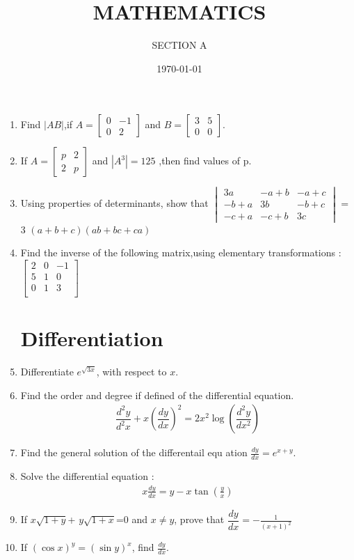 \documentclass[2pt,-letter paper]{article}
\title{MATHEMATICS}
\author{SECTION A}
\date{\today}
\providecommand{\myvec}[1]{\ensuremath{\begin{bmatrix}#1\end{bmatrix}}}
\providecommand{\brak}[1]{\ensuremath{\left(#1\right)}}
\begin{document}
\maketitle

\begin{enumerate}
\section{Matrix}
\item Find $|AB|$,if $A = \myvec{0 & -1 \\ 0 & 2}$ and $B = \myvec{3 & 5 \\ 0 & 0}$.
\item If $A = \myvec{p & 2 \\ 2 & p}$ and $|A^3| = 125$
,then find values of p.
\item Using properties of determinants, show that      $\begin{vmatrix}                                   
3a & -a + b & -a + c \\ -b + a & 3b & -b + c \\-c + a & -c + b & 3c\end{vmatrix}$ = 3 \brak{a + b + c}\brak{ab + bc + ca}
\item Find the inverse of the following matrix,using elementary transformations :                              $\begin{bmatrix}                                         2 & 0 & -1 \\                                          5 & 1 & 0 \\                                            0 & 1 & 3 \\                                          \end{bmatrix}$
\section{Differentiation}
\item Differentiate $e^{\sqrt{3x}}$, with respect to ${x}$.
\item Find the order and degree if defined of the differential equation. 
\begin{align*}
 \dfrac{d^2y}{d^2x}+x\brak{\dfrac{dy}{dx}}^2=2x^2\log\brak{\dfrac{d^2y}{dx^2}}
\end{align*}
\item Find the general solution of the differentail equ ation $\frac{dy}{dx} = e^{x+y}$.
\item Solve the differential equation :                \begin{align*}  x\frac{dy}{dx} = y - x\tan{\brak{\frac{y}{x}}}  \end{align*}
\item If $x\sqrt{1+y}$+ $y\sqrt{1+x}$=0 and $x\neq y$,   prove that $\dfrac{dy}{dx} = -\frac{1}{\brak{x+1}^2}$
\item If $\brak{\cos x}^y = \brak{\sin y}^x$, find $\frac{dy}{dx}$.

\end{enumerate}
\end{document}
